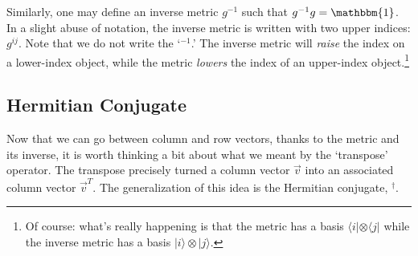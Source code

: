 Similarly, one may define an inverse metric $g^{-1}$ such that $g^{-1}g = \mathbbm{1}$. In a slight abuse of notation, the inverse metric is written with two upper indices: $g^{ij}$. Note that we do not write the `$^{-1}$.' The inverse metric will \emph{raise} the index on a lower-index object, while the metric \emph{lowers} the index of an upper-index object.\footnote{Of course: what’s really happening is that the metric has a basis $\langle i|\otimes \langle j|$ while the inverse metric has a basis $|i\rangle \otimes |j\rangle$.}


\subsection{Hermitian Conjugate}

Now that we can go between column and row vectors, thanks to the metric and its inverse, it is worth thinking a bit about what we meant by the `transpose’ operator. The transpose precisely turned a column vector $\vec{v}$ into an associated column vector $\vec{v}^T$. The generalization of this idea is the Hermitian conjugate, $^\dag$. 





